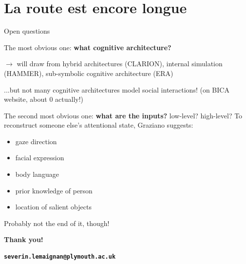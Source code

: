 \documentclass[compress]{beamer}
\begin{document}
\section{La route est encore longue}
\begin{frame}{Open questions}

    The most obvious one: {\bf what cognitive architecture?}

    $\rightarrow$ will draw from hybrid architectures (CLARION), internal
    simulation (HAMMER), sub-symbolic cognitive architecture (ERA)

    ...but not many cognitive architectures model social interactions! (on BICA
    website, about 0 actually!)

    \pause
    
    The second most obvious one: {\bf what are the inputs?} low-level?
    high-level? To reconstruct someone else's attentional state, Graziano suggests:

    \begin{itemize}
        \item gaze direction
        \item facial expression
        \item body language
        \item prior knowledge of person
        \item location of salient objects
    \end{itemize}

    Probably not the end of it, though!

\end{frame}

\begin{frame}[plain]{}

    {\bf Thank you!}

    {\bf\tt\scriptsize severin.lemaignan@plymouth.ac.uk}

\end{frame}
\end{document}
